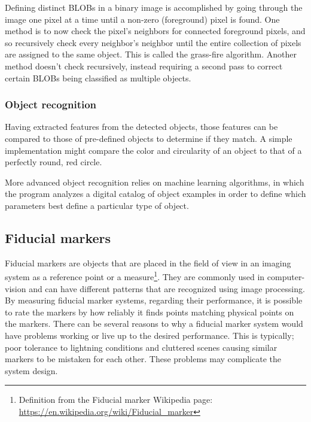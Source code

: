 			Defining distinct BLOBs in a binary image is accomplished by going through the image one pixel at a time until a non-zero (foreground) pixel is found. One method is to now check the pixel's neighbors for connected foreground pixels, and so recursively check every neighbor's neighbor until the entire collection of pixels are assigned to the same object. This is called the grass-fire algorithm. Another method doesn't check recursively, instead requiring a second pass to correct certain BLOBs being classified as multiple objects.
			
			\subsubsection{Object recognition}
				Having extracted features from the detected objects, those features can be compared to those of pre-defined objects to determine if they match. A simple implementation might compare the color and circularity of an object to that of a perfectly round, red circle. 
				
				More advanced object recognition relies on machine learning algorithms, in which the program analyzes a digital catalog of object examples in order to define which parameters best define a particular type of object.
			
			
			\subsection{Fiducial markers}\label{sec:fiducialMarkers}
			Fiducial markers are objects that are placed in the field of view in an imaging system as a reference point or a measure\footnote{Definition from the Fiducial marker Wikipedia page: \url{https://en.wikipedia.org/wiki/Fiducial_marker}}. They are commonly used in computer-vision and can have different patterns that are recognized using image processing. By measuring fiducial marker systems, regarding their performance, it is possible to rate the markers by how reliably it finds points matching physical points on the markers. There can be several reasons to why a fiducial marker system would have problems working or live up to the desired performance. This is typically; poor tolerance to lightning conditions and cluttered scenes causing similar markers to be mistaken for each other\cite{fiducialMarkers}. These problems may complicate the system design.\\
			
